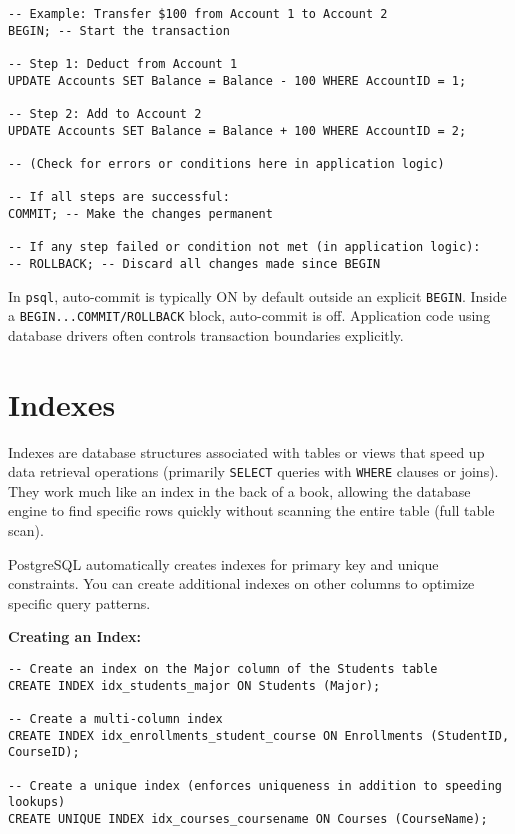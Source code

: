 \documentclass[12pt]{book}
\begin{document}
\begin{lstlisting}[caption={Basic Transaction Example}, label=lst:transaction_basic]
-- Example: Transfer $100 from Account 1 to Account 2
BEGIN; -- Start the transaction

-- Step 1: Deduct from Account 1
UPDATE Accounts SET Balance = Balance - 100 WHERE AccountID = 1;

-- Step 2: Add to Account 2
UPDATE Accounts SET Balance = Balance + 100 WHERE AccountID = 2;

-- (Check for errors or conditions here in application logic)

-- If all steps are successful:
COMMIT; -- Make the changes permanent

-- If any step failed or condition not met (in application logic):
-- ROLLBACK; -- Discard all changes made since BEGIN
\end{lstlisting}

In \texttt{psql}, auto-commit is typically ON by default outside an explicit \texttt{BEGIN}. Inside a \texttt{BEGIN...COMMIT/ROLLBACK} block, auto-commit is off. Application code using database drivers often controls transaction boundaries explicitly.

\section{Indexes}

Indexes are database structures associated with tables or views that speed up data retrieval operations (primarily \texttt{SELECT} queries with \texttt{WHERE} clauses or joins). They work much like an index in the back of a book, allowing the database engine to find specific rows quickly without scanning the entire table (full table scan).

PostgreSQL automatically creates indexes for primary key and unique constraints. You can create additional indexes on other columns to optimize specific query patterns.

\textbf{Creating an Index:}

\begin{lstlisting}[caption={Creating an Index}, label=lst:create_index]
-- Create an index on the Major column of the Students table
CREATE INDEX idx_students_major ON Students (Major);

-- Create a multi-column index
CREATE INDEX idx_enrollments_student_course ON Enrollments (StudentID, CourseID);

-- Create a unique index (enforces uniqueness in addition to speeding lookups)
CREATE UNIQUE INDEX idx_courses_coursename ON Courses (CourseName);
\end{lstlisting}
\end{document}
